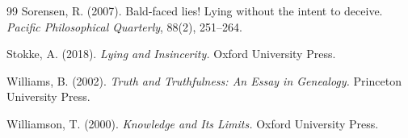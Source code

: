 \documentclass[11pt,a4paper]{article}
\begin{document}
\begin{thebibliography}{99}
Sorensen, R. (2007).
Bald-faced lies! Lying without the intent to deceive.
\emph{Pacific Philosophical Quarterly}, 88(2), 251--264.

Stokke, A. (2018).
\emph{Lying and Insincerity.}
Oxford University Press.

Williams, B. (2002).
\emph{Truth and Truthfulness: An Essay in Genealogy.}
Princeton University Press.

Williamson, T. (2000).
\emph{Knowledge and Its Limits.}
Oxford University Press.

\end{thebibliography}
\end{document}
